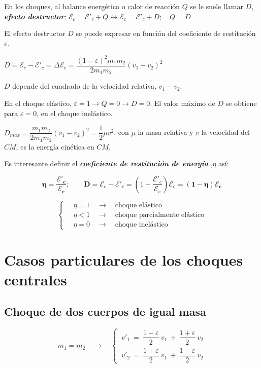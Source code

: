 En los choques, al balance energético o calor de reacción $Q$ se le suele llamar $D$, \emph{\textbf{efecto destructor}}: $\mathcal E_c=\mathcal E'_c+Q \leftrightarrow \mathcal E_c=\mathcal E'_c+D;\quad Q=D$
	
El efecto destructor $D$ se puede expresar en función del coeficiente de restitución $\varepsilon$.

$D=\mathcal E_c-\mathcal E'_c=\Delta  \mathcal E_c=	\dfrac{(1-\varepsilon)^2m_1m_2}{2m_1m_2}(v_1-v_2)^2$

$D$ depende del cuadrado de la velocidad relativa, $v_1-v_2$.

En el choque elástico, $\varepsilon = 1 \to Q=0 \to D=0$. El valor máximo de $D$ se obtiene para $\varepsilon=0$, en el choque inelástico.

$D_{max}=	\dfrac{m_1m_2}{2m_1m_2}(v_1-v_2)^2=\dfrac 1 2 \mu v^2$, con $\mu$ la masa relativa y $v$ la velocidad del $CM$, es la energía cinética en $CM$.
	
Es interesante definir el \emph{\textbf{coeficiente de restitución de energía}} ,$\eta$ así:

$$\boldsymbol{\eta=\dfrac {\mathcal E'_c}{\mathcal E_c}}; \qquad \boldsymbol{ D}=\mathcal E_c-\mathcal E'_c=\left(1-\dfrac{\mathcal E'_c}{\mathcal E_c}\right) \mathcal E_c=\boldsymbol{ (1-\eta)\mathcal E_c}$$


$$\begin{cases}
	\quad \eta = 1 \quad \to \quad \text{choque elástico} \\
	\quad \eta < 1 \quad \to \quad \text{choque parcialmente elástico} \\
	\quad \eta = 0 \quad \to \quad \text{choque inelástico}
\end{cases}$$	

\section{Casos particulares de los choques centrales}

\vspace{10mm} %
\subsection{Choque de dos cuerpos de igual masa}

$$m_1=m_2 \quad \to \quad 
\begin{cases}
\ v'_1\ =\ \dfrac{1-\varepsilon}{2} \ v_1 \ +\  \dfrac{1+\varepsilon}{2} \ v_2 \\	
\ v'_2\ =\ \dfrac{1+\varepsilon}{2} \ v_1\ +\  \dfrac{1-\varepsilon}{2} \ v_2 
\end{cases}$$

